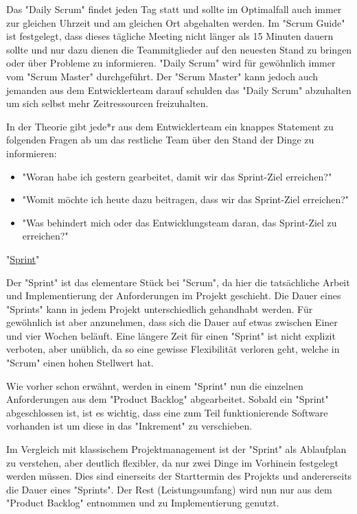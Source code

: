 Das "Daily Scrum" findet jeden Tag statt und sollte im Optimalfall auch immer  zur gleichen Uhrzeit und am gleichen Ort abgehalten werden. Im "Scrum Guide" ist festgelegt, dass dieses tägliche Meeting nicht länger als 15 Minuten dauern sollte und nur dazu dienen die Teammitglieder auf den neuesten Stand zu bringen oder über Probleme zu informieren. "Daily Scrum" wird für gewöhnlich immer vom "Scrum Master" durchgeführt. Der "Scrum Master" kann jedoch auch jemanden aus dem Entwicklerteam darauf schulden das "Daily Scrum" abzuhalten um sich selbst mehr Zeitressourcen freizuhalten.

In der Theorie gibt jede*r aus dem Entwicklerteam ein knappes Statement zu folgenden Fragen ab um das restliche Team über den Stand der Dinge zu informieren:

\begin{itemize}
    \item "Woran habe ich gestern gearbeitet, damit wir das Sprint-Ziel erreichen?" \cite{DailyScrum}
    \item "Womit möchte ich heute dazu beitragen, dass wir das Sprint-Ziel erreichen?" \cite{DailyScrum}
    \item "Was behindert mich oder das Entwicklungsteam daran, das Sprint-Ziel zu erreichen?" \cite{DailyScrum}
\end{itemize}

"\underline{Sprint}"

Der "Sprint" ist das elementare Stück bei "Scrum", da hier die tatsächliche Arbeit und Implementierung der Anforderungen im Projekt geschieht. Die Dauer eines "Sprints" kann in jedem Projekt unterschiedlich gehandhabt werden. Für gewöhnlich ist aber anzunehmen, dass sich die Dauer auf etwas zwischen Einer und vier Wochen beläuft. Eine längere Zeit für einen "Sprint" ist nicht explizit verboten, aber unüblich, da so eine gewisse Flexibilität verloren geht, welche in "Scrum" einen hohen Stellwert hat.

Wie vorher schon erwähnt, werden in einem "Sprint" nun die einzelnen Anforderungen aus dem "Product Backlog" abgearbeitet. Sobald ein "Sprint" abgeschlossen ist, ist es wichtig, dass eine zum Teil funktionierende Software vorhanden ist um diese in das "Inkrement" zu verschieben.

Im Vergleich mit klassischem Projektmanagement ist der "Sprint" als Ablaufplan zu verstehen, aber deutlich flexibler, da nur zwei Dinge im Vorhinein festgelegt werden müssen. Dies sind einerseits der Starttermin des Projekts und andererseits die Dauer eines "Sprints". Der Rest (Leistungsumfang) wird nun nur aus dem "Product Backlog" entnommen und zu Implementierung genutzt. \cite{Sprint}

